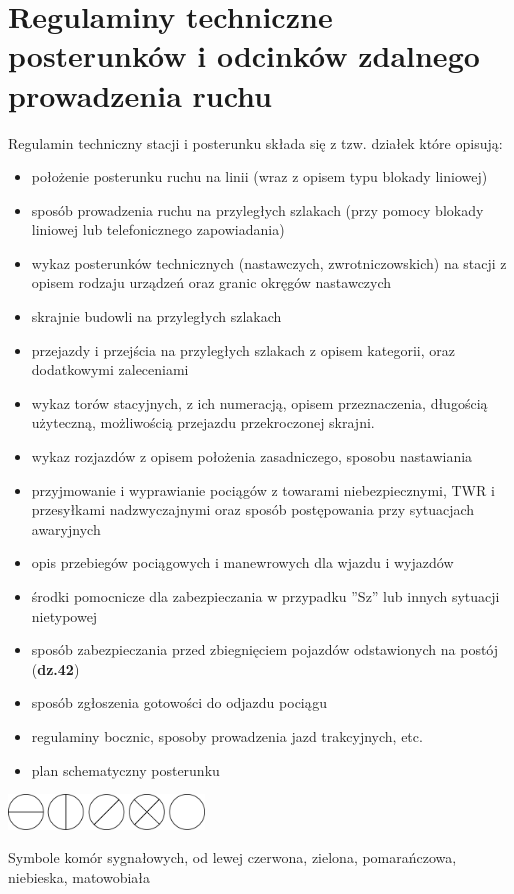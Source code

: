 \chapter{Regulaminy techniczne posterunków i odcinków zdalnego prowadzenia ruchu}

Regulamin techniczny stacji i posterunku składa się z tzw. działek które opisują:
\begin{itemize}
	\item położenie posterunku ruchu na linii (wraz z opisem typu blokady liniowej)
	\item sposób prowadzenia ruchu na przyległych szlakach (przy pomocy blokady liniowej lub telefonicznego zapowiadania)
	\item wykaz posterunków technicznych (nastawczych, zwrotniczowskich) na stacji z opisem rodzaju urządzeń oraz granic okręgów nastawczych
	\item skrajnie budowli na przyległych szlakach
	\item przejazdy i przejścia na przyległych szlakach z opisem kategorii, oraz dodatkowymi zaleceniami
	\item wykaz torów stacyjnych, z ich numeracją, opisem przeznaczenia, długością użyteczną, możliwością przejazdu przekroczonej skrajni.
	\item wykaz rozjazdów z opisem położenia zasadniczego, sposobu nastawiania
	\item przyjmowanie i wyprawianie pociągów z towarami niebezpiecznymi, TWR i przesyłkami nadzwyczajnymi oraz sposób postępowania przy sytuacjach awaryjnych
	\item opis przebiegów pociągowych i manewrowych dla wjazdu i wyjazdów
	\item środki pomocnicze dla zabezpieczania w przypadku ''Sz'' lub innych sytuacji nietypowej
	\item sposób zabezpieczania przed zbiegnięciem pojazdów odstawionych na postój (\textbf{dz.42})
	\item sposób zgłoszenia gotowości do odjazdu pociągu
	\item regulaminy bocznic, sposoby prowadzenia jazd trakcyjnych, etc.
	\item plan schematyczny posterunku
\end{itemize}
	\begin{marginfigure}
	\includegraphics[width=5.2cm]{skryptkierownik-img/komory_sygnalowe_pl.png}
	\caption{Symbole komór sygnałowych, od lewej czerwona, zielona, pomarańczowa, niebieska, matowobiała}
\end{marginfigure}

